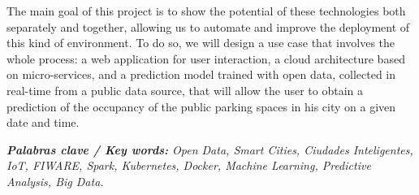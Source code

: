 The main goal of this project is to show the potential of these technologies both separately and together, allowing us to automate and improve the deployment of this kind of environment. To do so, we will design a use case that involves the whole process: a web application for user interaction, a cloud architecture based on micro-services, and a prediction model trained with open data, collected in real-time from a public data source, that will allow the user to obtain a prediction of the occupancy of the public parking spaces in his city on a given date and time.

\textit{\textbf{Palabras clave / Key words: } Open Data, Smart Cities, Ciudades Inteligentes, IoT, FIWARE, Spark, Kubernetes, Docker, Machine Learning, Predictive Analysis, Big Data. }